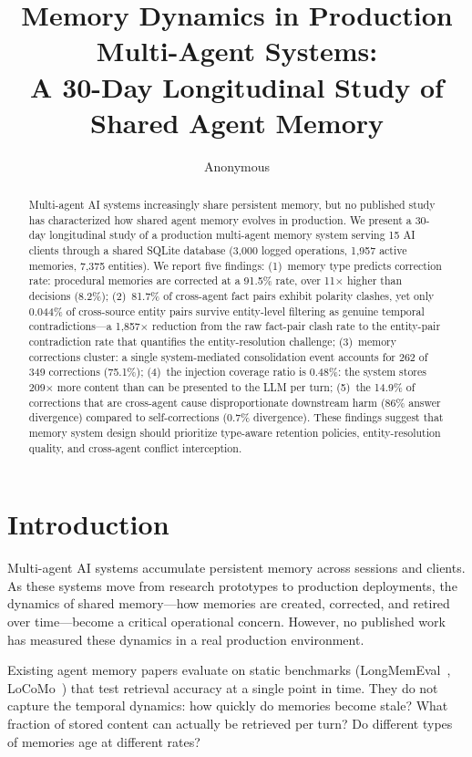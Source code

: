 \documentclass[11pt]{article}
\title{Memory Dynamics in Production Multi-Agent Systems:\\
A 30-Day Longitudinal Study of Shared Agent Memory}
\author{Anonymous}
\begin{document}
\maketitle

\begin{abstract}
Multi-agent AI systems increasingly share persistent memory, but no published study has characterized how shared agent memory evolves in production. We present a 30-day longitudinal study of a production multi-agent memory system serving 15 AI clients through a shared SQLite database (3,000 logged operations, 1,957 active memories, 7,375 entities). We report five findings: (1)~memory type predicts correction rate: procedural memories are corrected at a 91.5\% rate, over 11$\times$ higher than decisions (8.2\%); (2)~81.7\% of cross-agent fact pairs exhibit polarity clashes, yet only 0.044\% of cross-source entity pairs survive entity-level filtering as genuine temporal contradictions---a 1{,}857$\times$ reduction from the raw fact-pair clash rate to the entity-pair contradiction rate that quantifies the entity-resolution challenge; (3)~memory corrections cluster: a single system-mediated consolidation event accounts for 262 of 349 corrections (75.1\%); (4)~the injection coverage ratio is 0.48\%: the system stores 209$\times$ more content than can be presented to the LLM per turn; (5)~the 14.9\% of corrections that are cross-agent cause disproportionate downstream harm (86\% answer divergence) compared to self-corrections (0.7\% divergence). These findings suggest that memory system design should prioritize type-aware retention policies, entity-resolution quality, and cross-agent conflict interception.
\end{abstract}

\section{Introduction}
\label{sec:intro}

Multi-agent AI systems accumulate persistent memory across sessions and clients. As these systems move from research prototypes to production deployments, the dynamics of shared memory---how memories are created, corrected, and retired over time---become a critical operational concern. However, no published work has measured these dynamics in a real production environment.

Existing agent memory papers evaluate on static benchmarks (LongMemEval~\cite{wu2024longmemeval}, LoCoMo~\cite{locomo2024}) that test retrieval accuracy at a single point in time. They do not capture the temporal dynamics: how quickly do memories become stale? What fraction of stored content can actually be retrieved per turn? Do different types of memories age at different rates?
\end{document}
